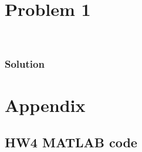 \documentclass[conf]{new-aiaa}
\begin{document}
\section*{Problem 1}

\begin{center}
 \\
\end{center}

\subsubsection*{Solution} 




\newpage
\section*{Appendix} 

\subsection*{HW4 MATLAB code} 

\begin{lstlisting}[basicstyle=\footnotesize]
% HW 5

\end{lstlisting}





\end{document}
